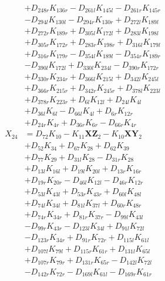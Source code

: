 \begin{multicols}{2}
\begin{align}
&+ D_{248r}K_{136r} - D_{261l}K_{145l} - D_{261r}K_{145r}  \nonumber \\
&- D_{294l}K_{130l} - D_{294r}K_{130r} + D_{272l}K_{189l}  \nonumber \\
&+ D_{272r}K_{189r} + D_{305l}K_{172l} + D_{283l}K_{198l}  \nonumber \\
&+ D_{305r}K_{172r} + D_{283r}K_{198r} + D_{316l}K_{179l}  \nonumber \\
&+ D_{316r}K_{179r} - D_{354l}K_{189l} - D_{354r}K_{189r}  \nonumber \\
&- D_{390l}K_{172l} + D_{330l}K_{234l} - D_{390r}K_{172r}  \nonumber \\
&+ D_{330r}K_{234r} + D_{366l}K_{215l} + D_{342l}K_{245l}  \nonumber \\
&+ D_{366r}K_{215r} + D_{342r}K_{245r} + D_{378l}K_{223l}  \nonumber \\
&+ D_{378r}K_{223r} + D_{6l}K_{12l} + D_{24l}K_{4l}  \nonumber \\
&+ D_{36l}K_{6l} - D_{66l}K_{4l} + D_{6r}K_{12r}  \nonumber \\
&+ D_{24r}K_{4r} + D_{36r}K_{6r} - D_{66r}K_{4r} \nonumber \\
X_{24} &= D_{72}K_{10} - K_{11}\mathbf{XZ}_2 - K_{10}\mathbf{XY}_2  \nonumber \\
&+ D_{52}K_{34} + D_{67}K_{28} + D_{62}K_{39}  \nonumber \\
&+ D_{77}K_{29} + D_{31l}K_{28} - D_{31r}K_{28}  \nonumber \\
&+ D_{13l}K_{16l} + D_{19l}K_{20l} + D_{13r}K_{16r}  \nonumber \\
&+ D_{19r}K_{20r} - D_{46l}K_{12l} - D_{46r}K_{12r}  \nonumber \\
&+ D_{53l}K_{43l} + D_{53r}K_{43r} + D_{60l}K_{48l}  \nonumber \\
&+ D_{74l}K_{34l} + D_{81l}K_{37l} + D_{60r}K_{48r}  \nonumber \\
&+ D_{74r}K_{34r} + D_{81r}K_{37r} - D_{99l}K_{43l}  \nonumber \\
&- D_{99r}K_{43r} - D_{123l}K_{34l} + D_{91l}K_{72l}  \nonumber \\
&- D_{123r}K_{34r} + D_{91r}K_{72r} + D_{115l}K_{61l}  \nonumber \\
&+ D_{107l}K_{79l} + D_{115r}K_{61r} + D_{131l}K_{65l}  \nonumber \\
&+ D_{107r}K_{79r} + D_{131r}K_{65r} - D_{142l}K_{72l}  \nonumber \\
&- D_{142r}K_{72r} - D_{169l}K_{61l} - D_{169r}K_{61r}  \nonumber \\

\end{align}
\end{multicols}
